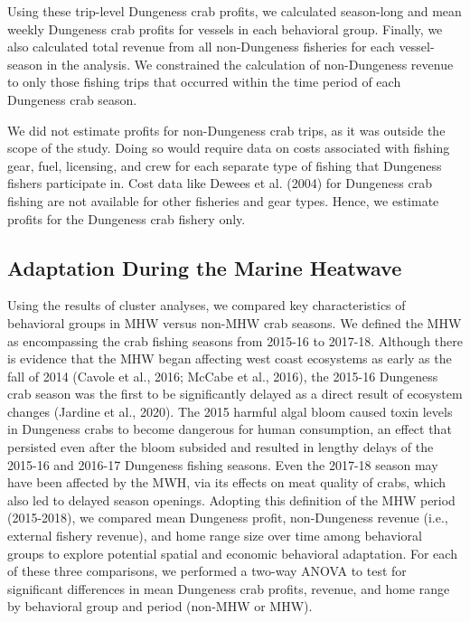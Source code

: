 \documentclass[]{elsarticle} %
\begin{document}
Using these trip-level Dungeness crab profits, we calculated season-long
and mean weekly Dungeness crab profits for vessels in each behavioral
group. Finally, we also calculated total revenue from all non-Dungeness
fisheries for each vessel-season in the analysis. We constrained the
calculation of non-Dungeness revenue to only those fishing trips that
occurred within the time period of each Dungeness crab season.

We did not estimate profits for non-Dungeness crab trips, as it was
outside the scope of the study. Doing so would require data on costs
associated with fishing gear, fuel, licensing, and crew for each
separate type of fishing that Dungeness fishers participate in. Cost
data like Dewees et al. (2004) for Dungeness crab fishing are not
available for other fisheries and gear types. Hence, we estimate profits
for the Dungeness crab fishery only.

\hypertarget{adaptation-during-the-marine-heatwave}{%
\subsection{Adaptation During the Marine
Heatwave}\label{adaptation-during-the-marine-heatwave}}

Using the results of cluster analyses, we compared key characteristics
of behavioral groups in MHW versus non-MHW crab seasons. We defined the
MHW as encompassing the crab fishing seasons from 2015-16 to 2017-18.
Although there is evidence that the MHW began affecting west coast
ecosystems as early as the fall of 2014 (Cavole et al., 2016; McCabe et
al., 2016), the 2015-16 Dungeness crab season was the first to be
significantly delayed as a direct result of ecosystem changes (Jardine
et al., 2020). The 2015 harmful algal bloom caused toxin levels in
Dungeness crabs to become dangerous for human consumption, an effect
that persisted even after the bloom subsided and resulted in lengthy
delays of the 2015-16 and 2016-17 Dungeness fishing seasons. Even the
2017-18 season may have been affected by the MWH, via its effects on
meat quality of crabs, which also led to delayed season openings.
Adopting this definition of the MHW period (2015-2018), we compared mean
Dungeness profit, non-Dungeness revenue (i.e., external fishery
revenue), and home range size over time among behavioral groups to
explore potential spatial and economic behavioral adaptation. For each
of these three comparisons, we performed a two-way ANOVA to test for
significant differences in mean Dungeness crab profits, revenue, and
home range by behavioral group and period (non-MHW or MHW).
\end{document}
